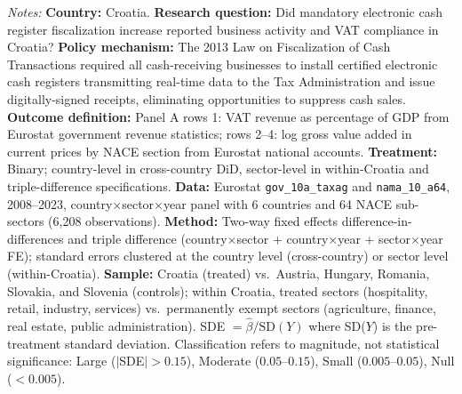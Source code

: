 \begin{table}[htbp]
\begin{tablenotes}[flushleft]
\item \textit{Notes:} \textbf{Country:} Croatia. \textbf{Research question:} Did mandatory electronic cash register fiscalization increase reported business activity and VAT compliance in Croatia? \textbf{Policy mechanism:} The 2013 Law on Fiscalization of Cash Transactions required all cash-receiving businesses to install certified electronic cash registers transmitting real-time data to the Tax Administration and issue digitally-signed receipts, eliminating opportunities to suppress cash sales. \textbf{Outcome definition:} Panel A rows 1: VAT revenue as percentage of GDP from Eurostat government revenue statistics; rows 2--4: log gross value added in current prices by NACE section from Eurostat national accounts. \textbf{Treatment:} Binary; country-level in cross-country DiD, sector-level in within-Croatia and triple-difference specifications. \textbf{Data:} Eurostat \texttt{gov\_10a\_taxag} and \texttt{nama\_10\_a64}, 2008--2023, country$\times$sector$\times$year panel with 6 countries and 64 NACE sub-sectors (6,208 observations). \textbf{Method:} Two-way fixed effects difference-in-differences and triple difference (country$\times$sector + country$\times$year + sector$\times$year FE); standard errors clustered at the country level (cross-country) or sector level (within-Croatia). \textbf{Sample:} Croatia (treated) vs.\ Austria, Hungary, Romania, Slovakia, and Slovenia (controls); within Croatia, treated sectors (hospitality, retail, industry, services) vs.\ permanently exempt sectors (agriculture, finance, real estate, public administration). SDE $= \hat{\beta} / \text{SD}(Y)$ where SD($Y$) is the pre-treatment standard deviation. Classification refers to magnitude, not statistical significance: Large ($|$SDE$| > 0.15$), Moderate ($0.05$--$0.15$), Small ($0.005$--$0.05$), Null ($< 0.005$).
\end{tablenotes}
\end{table}

